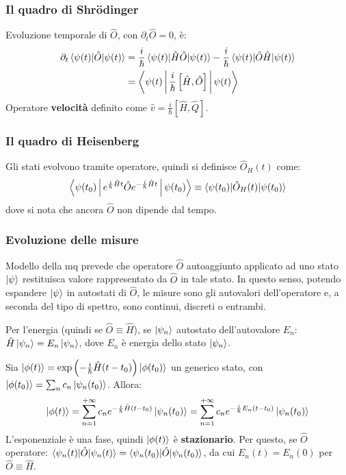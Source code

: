 \documentclass[11pt, a4paper]{scrartcl} %
\numberwithin{equation}{subsection}
\theoremstyle{style2}
\theoremstyle{style1}
\begin{document}
\subsubsection{Il quadro di Shr\"odinger}
Evoluzione temporale di $\hat{O}$, con $\partial _t \hat{O}=0$, \`e: 
\begin{equation}
	\begin{split}
		\partial _t  \braket{\psi (t)|\hat{O}|\psi (t)} &= \frac{i}{\hbar }\braket{\psi (t)|\hat{H}\hat{O}|\psi (t)} - \frac{i}{\hbar }\braket{\psi (t)|\hat{O}\hat{H}|\psi (t)} \\
	&= \Braket{\psi (t)|\frac{i}{\hbar }\left[ \hat{H},\hat{O} \right] |\psi (t)} 
	\end{split}
\end{equation}
Operatore \textbf{velocit\`a} definito come $\hat{v}= \frac{i}{\hbar }\left[ \hat{H},\hat{Q} \right] $.

\subsubsection{Il quadro di Heisenberg}

Gli stati evolvono tramite operatore, quindi si definisce $\hat{O}_H (t)$ come:
\begin{equation}
	\Braket{\psi (t_0)|e^{\frac{i}{\hbar }\hat{H}t} \hat{O}e^{-\frac{i}{\hbar }\hat{H}t} |\psi (t_0)} \equiv \braket{\psi (t_0)|\hat{O}_H(t)|\psi (t_0)} 
\end{equation}
dove si nota che ancora $\hat{O}$ non dipende dal tempo.
\subsubsection{Evoluzione delle misure}

Modello della mq prevede che operatore $\hat{O}$ autoaggiunto applicato ad uno stato $\ket{\psi } $ restituisca valore rappresentato da $\hat{O}$ in tale stato. In questo senso, potendo espandere $\ket{\psi } $ in autostati di $\hat{O}$, le misure sono gli autovalori dell'operatore e, a seconda del tipo di spettro, sono continui, discreti o entrambi.

Per l'energia (quindi se $\hat{O}\equiv \hat{H}$), se $\ket{\psi _n} $ autostato dell'autovalore $E_n$: $\hat{H}\ket{\psi _n} = E_n \ket{\psi _n} $, dove $E_n$ \`e energia dello stato $\ket{\psi _n} $. 

Sia $\ket{\phi(t) }  = \exp\left(-\frac{i}{\hbar }\hat{H}(t-t_0)\right) \ket{\phi (t_0)} $ un generico stato, con $\ket{\phi (t_0)} =\sum_{n}^{} c_n \ket{\psi _n(t_0)} $. Allora:
\begin{equation}
	\ket{\phi (t)} = \sum_{n=1}^{+\infty} c_n e^{-\frac{i}{\hbar } \hat{H}(t-t_0)} \ket{\psi _n(t_0)} = \sum_{n=1}^{+\infty} c_n e^{-\frac{i}{\hbar }E_n (t-t_0)} \ket{\psi _n(t_0)}  
\end{equation}
L'esponenziale \`e una fase, quindi $\ket{\phi (t)} $ \`e \textbf{stazionario}. Per questo, se $\hat{O}$ operatore: $\braket{\psi _n(t)|\hat{O}|\psi _n(t)} = \braket{\psi _n(t_0)|\hat{O}|\psi _n(t_0)} $, da cui $E_n(t) = E_n(0)$ per $\hat{O}\equiv \hat{H}$.
\end{document}
